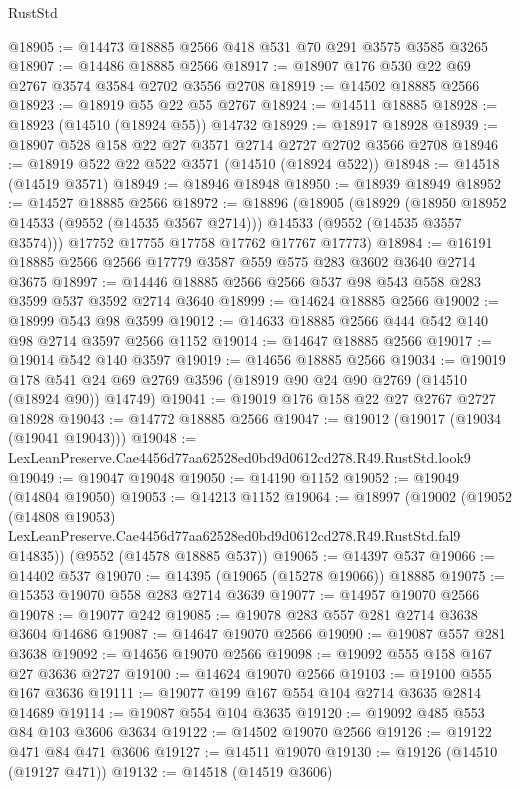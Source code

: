 \begin{lexlean}{RustStd}
\begin{coremodule}
@18905 := @14473 @18885 @2566 @418 @531 @70 @291 @3575 @3585 @3265
@18907 := @14486 @18885 @2566
@18917 := @18907 @176 @530 @22 @69 @2767 @3574 @3584 @2702 @3556 @2708
@18919 := @14502 @18885 @2566
@18923 := @18919 @55 @22 @55 @2767
@18924 := @14511 @18885
@18928 := @18923 (@14510 (@18924 @55)) @14732
@18929 := @18917 @18928
@18939 := @18907 @528 @158 @22 @27 @3571 @2714 @2727 @2702 @3566 @2708
@18946 := @18919 @522 @22 @522 @3571 (@14510 (@18924 @522))
@18948 := @14518 (@14519 @3571)
@18949 := @18946 @18948
@18950 := @18939 @18949
@18952 := @14527 @18885 @2566
@18972 := @18896
    (@18905
      (@18929
        (@18950 @18952 @14533 (@9552 (@14535 @3567 @2714)))
        @14533
        (@9552 (@14535 @3557 @3574)))
      @17752
      @17755
      @17758
      @17762
      @17767
      @17773)
@18984 := @16191 @18885 @2566 @2566 @17779 @3587 @559 @575 @283 @3602 @3640 @2714 @3675
@18997 := @14446 @18885 @2566 @2566 @537 @98 @543 @558 @283 @3599 @537 @3592 @2714 @3640
@18999 := @14624 @18885 @2566
@19002 := @18999 @543 @98 @3599
@19012 := @14633 @18885 @2566 @444 @542 @140 @98 @2714 @3597 @2566 @1152
@19014 := @14647 @18885 @2566
@19017 := @19014 @542 @140 @3597
@19019 := @14656 @18885 @2566
@19034 := @19019
    @178
    @541
    @24
    @69
    @2769
    @3596
    (@18919 @90 @24 @90 @2769 (@14510 (@18924 @90)) @14749)
@19041 := @19019 @176 @158 @22 @27 @2767 @2727 @18928
@19043 := @14772 @18885 @2566
@19047 := @19012 (@19017 (@19034 (@19041 @19043)))
@19048 := LexLeanPreserve.Cae4456d77aa62528ed0bd9d0612cd278.R49.RustStd.look9
@19049 := @19047 @19048
@19050 := @14190 @1152
@19052 := @19049 (@14804 @19050)
@19053 := @14213 @1152
@19064 := @18997
    (@19002
      (@19052
        (@14808 @19053)
        LexLeanPreserve.Cae4456d77aa62528ed0bd9d0612cd278.R49.RustStd.fal9
        @14835))
    (@9552 (@14578 @18885 @537))
@19065 := @14397 @537
@19066 := @14402 @537
@19070 := @14395 (@19065 (@15278 @19066)) @18885
@19075 := @15353 @19070 @558 @283 @2714 @3639
@19077 := @14957 @19070 @2566
@19078 := @19077 @242
@19085 := @19078 @283 @557 @281 @2714 @3638 @3604 @14686
@19087 := @14647 @19070 @2566
@19090 := @19087 @557 @281 @3638
@19092 := @14656 @19070 @2566
@19098 := @19092 @555 @158 @167 @27 @3636 @2727
@19100 := @14624 @19070 @2566
@19103 := @19100 @555 @167 @3636
@19111 := @19077 @199 @167 @554 @104 @2714 @3635 @2814 @14689
@19114 := @19087 @554 @104 @3635
@19120 := @19092 @485 @553 @84 @103 @3606 @3634
@19122 := @14502 @19070 @2566
@19126 := @19122 @471 @84 @471 @3606
@19127 := @14511 @19070
@19130 := @19126 (@14510 (@19127 @471))
@19132 := @14518 (@14519 @3606)

\end{coremodule}
\end{lexlean}
